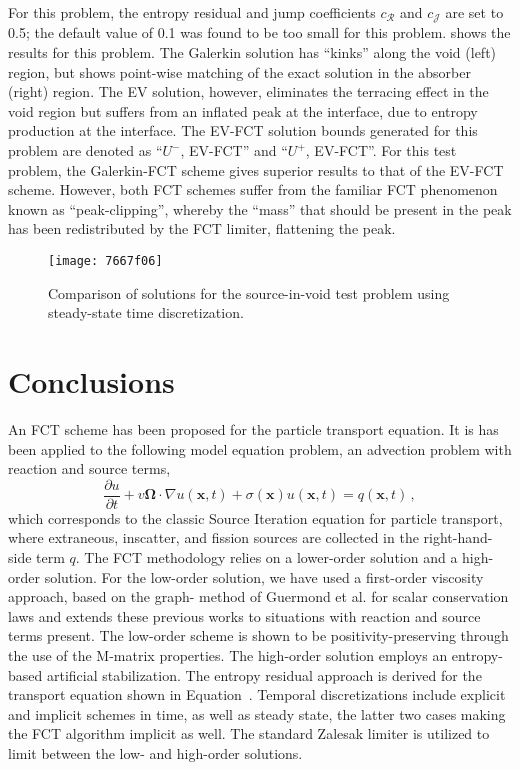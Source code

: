 \documentclass[xchauthor,chkrefs,fixeqskip,GCNS,amsmath,amsthm]{yjcphg}
\theoremstyle{remark}
\newcommand{\di}{\bm{\Omega}}
\begin{document}
For this problem, the entropy residual and jump coefficients
$c_{\mathcal{R}}$ and $c_{\mathcal{J}}$ are set to 0.5; the default
value of 0.1 was found to be too small for this problem.
 shows the results for this problem. The
Galerkin solution has ``kinks'' along the void (left) region, but shows
point-wise matching of the exact solution in the absorber (right)
region. The EV solution, however, eliminates the terracing effect in the
void region but suffers from an inflated peak at the interface, due to
entropy production at the interface. The EV-FCT solution bounds
generated for this problem are denoted as ``$U^{-}$, EV-FCT'' and ``$U
^{+}$, EV-FCT''. For this test problem, the Galerkin-FCT scheme gives
superior results to that of the EV-FCT scheme. However, both FCT schemes
suffer from the familiar FCT phenomenon known as ``peak-clipping'',
whereby the ``mass'' that should be present in the peak has been
redistributed by the FCT limiter, flattening the peak.

\begin{figure}
\texttt{[image: 7667f06]}
\caption{Comparison of solutions for the source-in-void test problem using
steady-state time discretization.}
\label{fig:source_in_void}
\end{figure}

\section{Conclusions}%
\label{sec:conclusions}
An FCT scheme has been proposed for the particle transport equation. It
is has been applied to the following model equation problem, an
advection problem with reaction and source terms,
%
\begin{equation}
\label{eq:ccl}
\frac{\partial u}{\partial t} + v\di\cdot\nabla u(\mathbf{x},t)+
\sigma(\mathbf{x}) u(\mathbf{x},t)= q(\mathbf{x},t)\,,
\end{equation}
%
which corresponds to the classic Source Iteration equation for particle
transport, where extraneous, inscatter, and fission sources are
collected in the right-hand-side term $q$. The FCT methodology relies
on a lower-order solution and a high-order solution. For the low-order
solution, we have used a first-order viscosity approach, based on the
graph- method of Guermond et al.
\cite{guermond_firstorder} for scalar conservation laws and extends
these previous works to situations with reaction and source terms
present. The low-order scheme is shown to be positivity-preserving
through the use of the M-matrix properties. The high-order solution
employs an entropy-based artificial stabilization. The entropy residual
approach is derived for the transport equation shown in
Equation~. Temporal discretizations include explicit and
implicit schemes in time, as well as steady state, the latter two cases
making the FCT algorithm implicit as well. The standard Zalesak limiter
is utilized to limit between the low- and high-order solutions.
\end{document}
